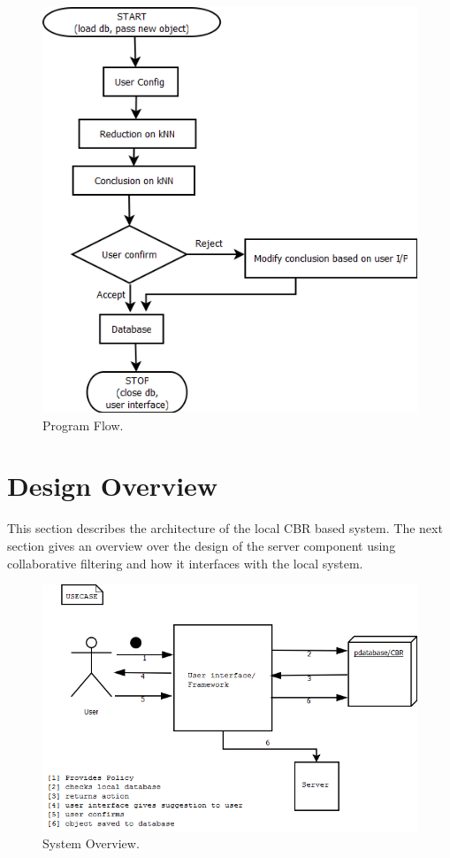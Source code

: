 \begin{figure}[htbp]
\begin{center}
\includegraphics[width = \textwidth]{DesignReport/uml/flowchart.png}
\caption{Program Flow.}
\label{DesignFlowChrt}
\end{center}
\end{figure}

\section{Design Overview}
This section describes the architecture of the local CBR based system. The next section gives an overview over the design of the server component using collaborative filtering and how it interfaces with the local system.  

\begin{figure}[htbp]
\begin{center}
\includegraphics[width = \textwidth]{DesignReport/uml/Case.png}
\caption{System Overview.}
\label{SystemOverview}
\end{center}
\end{figure}

